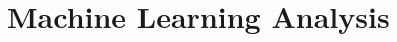 \documentclass[edeposit,fullpage]{uiucthesis2009}
\begin{document}


\chapter{Machine Learning Analysis}

\end{document}
